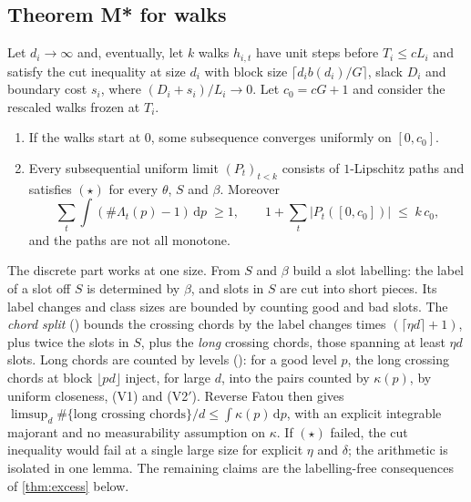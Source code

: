 \subsection{Theorem M* for walks}

\begin{theorem}\label{thm:mstar-walk}
Let $d_i\to\infty$ and, eventually, let $k$ walks $h_{i,t}$ have unit steps before $T_i\le cL_i$
and satisfy the cut inequality at size $d_i$ with block size $\lceil d_ib(d_i)/G\rceil$, slack
$D_i$ and boundary cost $s_i$, where $(D_i+s_i)/L_i\to0$. Let $c_0=cG+1$ and consider the rescaled
walks frozen at $T_i$.
\begin{enumerate}[label=(\alph*)]
\item If the walks start at $0$, some subsequence converges uniformly on $[0,c_0]$.
\item Every subsequential uniform limit $(P_t)_{t<k}$ consists of $1$-Lipschitz paths and
satisfies $(\star)$ for every $\theta$, $S$ and $\beta$. Moreover
\[
  \sum_t\int(\#\Lambda_t(p)-1)\,\mathrm{d}p\;\ge1,\qquad
  1+\sum_t\bigl|P_t([0,c_0])\bigr|\;\le\;k\,c_0,
\]
and the paths are not all monotone.
\end{enumerate}
\end{theorem}

\begin{outline}
The discrete part works at one size. From $S$ and $\beta$ build a slot labelling: the label of a
slot off $S$ is determined by $\beta$, and slots in $S$ are cut into short pieces. Its label changes
and class sizes are bounded by counting good and bad slots. The \emph{chord split}
() bounds the crossing chords by the label changes times $(\lceil\eta d\rceil+1)$, plus
twice the slots in $S$, plus the \emph{long} crossing chords, those spanning at least $\eta d$
slots. Long chords are counted by levels (): for a good level $p$, the
long crossing chords at block $\lfloor pd\rfloor$ inject, for large $d$, into the pairs counted by
$\kappa(p)$, by uniform closeness, (V1) and (V2$'$). Reverse Fatou then gives
$\limsup_d\#\{\text{long crossing chords}\}/d\le\int\kappa(p)\,\mathrm{d}p$, with an explicit integrable
majorant and no measurability assumption on $\kappa$. If $(\star)$ failed, the cut inequality would
fail at a single large size for explicit $\eta$ and $\delta$; the arithmetic is isolated in one
lemma. The remaining claims are the labelling-free consequences of \cref{thm:excess} below.
\end{outline}

